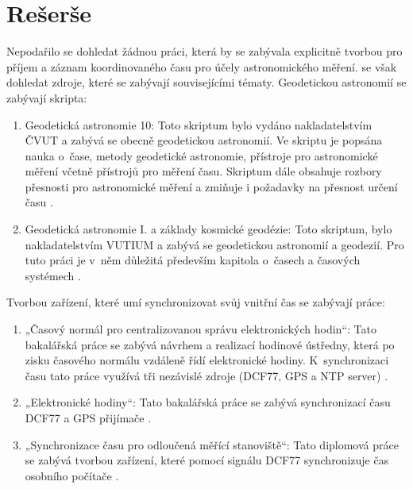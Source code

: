 \chapter{Rešerše}
\label{2-reserse}
Nepodařilo se dohledat žádnou práci, která by se zabývala explicitně tvorbou  pro příjem a záznam koordinovaného času pro účely astronomického měření.  se však dohledat zdroje, které se zabývají souvisejícími tématy. Geodetickou astro\-nomií se zabývají skripta:
\begin{enumerate}
    \item Geodetická astronomie 10: Toto skriptum bylo vydáno nakladatelstvím ČVUT a zabývá se obecně geodetickou astronomií. Ve skriptu je popsána nauka o~čase, metody geodetické astronomie, přístroje pro astronomické měření včetně přístrojů pro měření času. Skriptum dále obsahuje rozbory přesnosti pro astronomické měření a zmiňuje i požadavky na přesnost určení času \cite{kostelecky_geodeticka_astronomie}.
    \item Geodetická astronomie I. a základy kosmické geodézie: Toto skriptum, bylo  nakladatelstvím VUTIUM a zabývá se geodetickou astronomií a  geodezií. Pro tuto práci je v~něm důležitá především kapitola o~časech a časových systémech \cite{fixel_geodeticka_astronomie}.
\end{enumerate}
Tvorbou zařízení, které umí synchronizovat svůj vnitřní čas se zabývají práce:
\begin{enumerate}
    \item „Časový normál pro centralizovanou správu elektronických hodin“: Tato bakalářská práce se zabývá návrhem a realizací hodinové ústředny, která po zisku časového normálu vzdáleně řídí elektronické hodiny. K~synchronizaci času tato práce využívá tři nezávislé zdroje (DCF77, GPS a NTP server) \cite{pilik_casovy_normal}.
    \item „Elektronické hodiny“: Tato bakalářská práce se zabývá synchronizací času  DCF77 a GPS přijímače \cite{havlicek_elektronicke_hodiny}.
    \item „Synchronizace času pro odloučená měřící stanoviště“: Tato diplomová práce se zabývá tvorbou zařízení, které pomocí signálu DCF77 synchronizuje čas osobního počítače \cite{zeis_synchronizace_casu}.%
\end{enumerate}